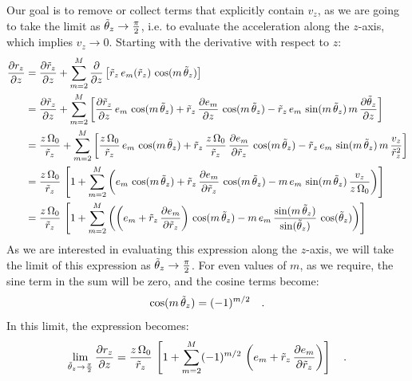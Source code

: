 Our goal is to remove or collect terms that explicitly contain $v_z$, as we are going to
take the limit as $\tilde{\theta}_z \to \frac{\pi}{2}$, i.e. to evaluate the acceleration along the
$z$-axis, which implies $v_z \to 0$.
Starting with the derivative with respect to $z$:
\begin{align}
    \frac{\partial r_z}{\partial z} &=
        \frac{\partial \tilde{r}_z}{\partial z} +
        \sum_{m=2}^{M} \frac{\partial}{\partial z}
            \left[\tilde{r}_z \, e_m(\tilde{r}_z) \, \cos(m \, \tilde{\theta}_z)\right]\\
    &= \frac{\partial \tilde{r}_z}{\partial z} +
        \sum_{m=2}^{M} \left[
        \frac{\partial \tilde{r}_z}{\partial z} \, e_m \, \cos(m \, \tilde{\theta}_z)
        + \tilde{r}_z \, \frac{\partial e_m}{\partial z} \, \cos(m \, \tilde{\theta}_z)
        - \tilde{r}_z \, e_m \, \sin(m \, \tilde{\theta}_z) \, m \,\frac{\partial \tilde{\theta}_z}{\partial z}\right]\\
    &= \frac{z\,\Omega_0}{\tilde{r}_z} + \sum_{m=2}^{M} \left[
        \frac{z\,\Omega_0}{\tilde{r}_z} \, e_m \, \cos(m \, \tilde{\theta}_z) +
        \tilde{r}_z \, \frac{z\,\Omega_0}{\tilde{r}_z} \, \frac{\partial e_m}{\partial \tilde{r}_z} \, \cos(m \, \tilde{\theta}_z) -
        \tilde{r}_z \, e_m \, \sin(m \, \tilde{\theta}_z) \, m \, \frac{v_z}{\tilde{r}_z^2}\right]\\
    &= \frac{z\,\Omega_0}{\tilde{r}_z} \, \left[
        1 + \sum_{m=2}^{M} \left(
            e_m \, \cos(m \, \tilde{\theta}_z) +
                \tilde{r}_z \, \frac{\partial e_m}{\partial \tilde{r}_z} \, \cos(m \, \tilde{\theta}_z) -
                m \, e_m \, \sin(m \, \tilde{\theta}_z) \, \frac{v_z}{z\,\Omega_0}
        \right)
    \right]\\
    &= \frac{z\,\Omega_0}{\tilde{r}_z} \, \left[
        1 + \sum_{m=2}^{M} \left(
            \left(e_m + \tilde{r}_z \, \frac{\partial e_m}{\partial \tilde{r}_z}\right) \,
                \cos(m \, \tilde{\theta}_z) -
            m \, e_m \, \frac{\sin(m \, \tilde{\theta}_z)}{\sin(\tilde{\theta}_z)} \, \cos(\tilde{\theta}_z)
        \right)
    \right]
\end{align}
As we are interested in evaluating this expression along the $z$-axis, we will take the
limit of this expression as $\tilde{\theta}_z \to \frac{\pi}{2}$.
For even values of $m$, as we require, the sine term in the sum will be zero, and the
cosine terms become:
\begin{equation}
    \cos(m \, \tilde{\theta}_z) = (-1)^{m/2} \quad .
\end{equation}
In this limit, the expression becomes:
\begin{equation}
    \lim_{\tilde{\theta}_z \to \frac{\pi}{2}} \frac{\partial r_z}{\partial z} =
        \frac{z\,\Omega_0}{\tilde{r}_z} \, \left[
            1 + \sum_{m=2}^{M} (-1)^{m/2} \,
                \left(e_m + \tilde{r}_z \, \frac{\partial e_m}{\partial \tilde{r}_z}\right)
        \right] \quad .
\end{equation}

